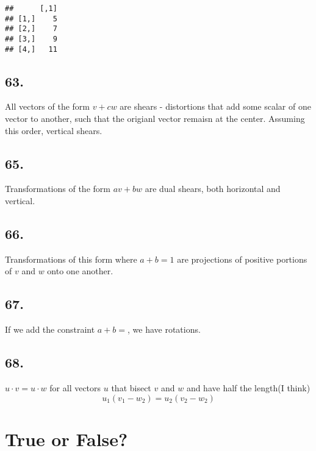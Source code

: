 \documentclass[]{article}
\begin{document}
\begin{verbatim}
##      [,1]
## [1,]    5
## [2,]    7
## [3,]    9
## [4,]   11
\end{verbatim}

\hypertarget{section-27}{%
\subsection{63.}\label{section-27}}

All vectors of the form \(v +cw\) are shears - distortions that add some
scalar of one vector to another, such that the origianl vector remaisn
at the center. Assuming this order, vertical shears.

\hypertarget{section-28}{%
\subsection{65.}\label{section-28}}

Transformations of the form \(av+ bw\) are dual shears, both horizontal
and vertical.

\hypertarget{section-29}{%
\subsection{66.}\label{section-29}}

Transformations of this form where \(a +b =1\) are projections of
positive portions of \(v\) and \(w\) onto one another.

\hypertarget{section-30}{%
\subsection{67.}\label{section-30}}

If we add the constraint \(a +b=\), we have rotations.

\hypertarget{section-31}{%
\subsection{68.}\label{section-31}}

\(u \cdot v =u \cdot w\) for all vectors \(u\) that bisect \(v\) and
\(w\) and have half the length(I think)
\[u_1(v_1 - w_2) = u_2(v_2 - w_2)\]

\hypertarget{true-or-false}{%
\section{True or False?}\label{true-or-false}}
\end{document}
